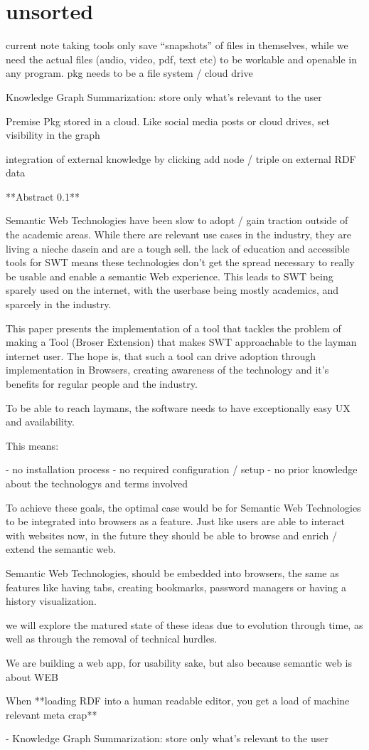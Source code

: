 \section{unsorted}
current note taking tools only save “snapshots” of files in themselves, while we need the actual files (audio, video, pdf, text etc) to be workable and openable in any program. pkg needs to be a file system / cloud drive

Knowledge Graph Summarization: store only what’s relevant to the user

Premise Pkg stored in a cloud. Like social media posts or cloud drives, set visibility in the graph

integration of external knowledge by clicking add node / triple on external RDF data

**Abstract 0.1**

Semantic Web Technologies have been slow to adopt / gain traction outside of the academic areas. While there are relevant use cases in the industry, they are living a nieche dasein and are a tough sell. the lack of education and accessible tools for SWT means these technologies don’t get the spread necessary to really be usable and enable a semantic Web experience. This leads to SWT being sparely used on the internet, with the userbase being mostly academics, and sparcely in the industry.

This paper presents the implementation of a tool that tackles the problem of making a Tool (Broser Extension) that makes SWT approachable to the layman internet user. The hope is, that such a tool can drive adoption through implementation in Browsers, creating awareness of the technology and it’s benefits for regular people and the industry.

To be able to reach laymans, the software needs to have exceptionally easy UX and availability.

This means:

- no installation process
- no required configuration / setup
- no prior knowledge about the technologys and terms involved

To achieve these goals, the optimal case would be for Semantic Web Technologies to be integrated into browsers as a feature. Just like users are able to interact with websites now, in the future they should be able to browse and enrich / extend the semantic web.

Semantic Web Technologies, should be embedded into browsers, the same as features like having tabs, creating bookmarks, password managers or having a history visualization.

we will explore the matured state of these ideas due to evolution through time, as well as through the removal of technical hurdles.

We are building a web app, for usability sake, but also because semantic web is about WEB

When **loading RDF into a human readable editor, you get a load of machine relevant meta crap**

- Knowledge Graph Summarization: store only what’s relevant to the user

